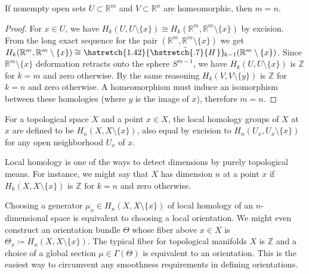 \documentclass[english,letterpaper]{article}%
\numberwithin{equation}{section}
\numberwithin{figure}{section}
\numberwithin{table}{section}
\theoremstyle{definition}
\theoremstyle{definition}
\theoremstyle{definition}
\theoremstyle{plain}
\theoremstyle{plain}
\theoremstyle{plain}
\theoremstyle{plain}
\theoremstyle{remark}
\theoremstyle{remark}
\newcommand{\bbR}{\mathbb{R}}
\newcommand{\bbZ}{\mathbb{Z}}
\newcommand\wt[1]{\hstretch{1.42}{\tilde{\hstretch{.7}{#1\mkern2mu}}}\mkern-2mu}
\begin{document}
\begin{cor}
    If nonempty open sets $U\subset \bbR^m$ and $V\subset \bbR^n$ are homeomorphic, then $m=n$.
\end{cor}
\begin{proof}
     For $x\in U$, we have $H_k(U,U\setminus \{x\})\cong H_k(\bbR^m,\bbR^m\setminus \{x\})$ by excision. From the long exact sequence for the pair $(\bbR^m,\bbR^m\setminus\{x\})$ we get $H_k(\bbR^m,\bbR^m\setminus\{x\})\cong \wt{H}_{k-1}(\bbR^m\setminus\{x\})$. Since $\bbR^m\setminus\{x\}$ deformation retracts onto the sphere $S^{m-1}$, we have $H_k(U,U\setminus\{x\})$ is $\bbZ$ for $k=m$ and zero otherwise. By the same reasoning $H_k(V,V\setminus\{y\})$ is $\bbZ$ for $k=n$ and zero otherwise. A homeomorphism must induce an isomorphism between these homologies (where $y$ is the image of $x$), therefore $m=n$.
\end{proof}

\begin{defn}
    For a topological space $X$ and a point $x\in X$, the local homology groups of $X$ at $x$ are defined to be $H_n(X,X\setminus\{x\})$, also equal by excision to $H_n(U_x,U_x\setminus\{x\})$ for any open neighborhood $U_x$ of $x$.
\end{defn}

\begin{rem}
    Local homology is one of the ways to detect dimensions by purely topological means. For instance, we might say that $X$ has dimension $n$ at a point $x$ if $H_k(X,X\setminus\{x\})$ is $\bbZ$ for $k=n$ and zero otherwise.
    
    Choosing a generator $\mu_x\in H_n(X,X\setminus\{x\}) $ of local homology of an $n$-dimensional space is equivalent to choosing a local orientation. We might even construct an orientation bundle $\Theta$ whose fiber above $x\in X$ is $\Theta_x\coloneqq H_n(X,X\setminus\{x\})$. The typical fiber for topological manifolds $X$ is $\bbZ$ and a choice of a global section $\mu\in\Gamma(\Theta)$ is equivalent to an orientation. This is the easiest way to circumvent any smoothness requirements in defining orientations.
\end{rem}
\end{document}
